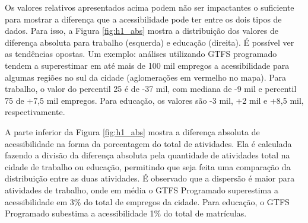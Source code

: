 \documentclass[        
    a4paper,          %
    12pt,             %
    chapter=TITLE,    %
    section=Title,    %
    subsection=Title, %
    oneside,          %
    english,          %
    spanish,          %
    brazil,           %
    fleqn             %
]{abntex2}
\begin{document}
  Os valores relativos apresentados acima podem não ser impactantes o suficiente para mostrar a diferença que a acessibilidade pode ter entre os dois tipos de dados. Para isso, a Figura \ref{fig:h1_abs} mostra a distribuição dos valores de diferença absoluta para trabalho (esquerda) e educação (direita). É possível ver as tendências opostas. Um exemplo: análises utilizando GTFS programado tendem a superestimar em até mais de 100 mil empregos a acessibilidade para algumas regiões no sul da cidade (aglomerações em vermelho no mapa). Para trabalho, o valor do percentil 25 é de -37 mil, com mediana de -9 mil e percentil 75 de +7,5 mil empregos. Para educação, os valores são -3 mil, +2 mil e +8,5 mil, respectivamente.
  
  A parte inferior da Figura \ref{fig:h1_abs} mostra a diferença absoluta de acessibilidade na forma da porcentagem do total de atividades. Ela é calculada fazendo a divisão da diferença absoluta pela quantidade de atividades total na cidade de trabalho ou educação, permitindo que seja feita uma comparação da distribuição entre as duas atividades. É observado que a dispersão é maior para atividades de trabalho, onde em média o GTFS Programado superestima a acessibilidade em 3\% do total de empregos da cidade. Para educação, o GTFS Programado subestima a acessibilidade 1\% do total de matrículas.
  
  \begin{figure}[!h]
  \captionsetup{width=16cm}
  \centering
  \end{figure}
  
\end{document}
